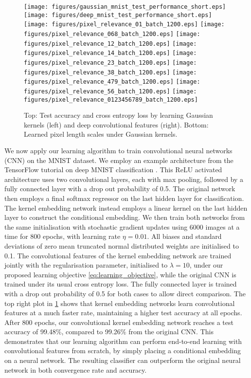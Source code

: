\documentclass{article}
\begin{document}
		\begin{figure}[t]
			\centering 
			\texttt{[image: figures/gaussian\_mnist\_test\_performance\_short.eps]}
			\texttt{[image: figures/deep\_mnist\_test\_performance\_short.eps]}
			\texttt{[image: figures/pixel\_relevance\_01\_batch\_1200.eps]}
			\texttt{[image: figures/pixel\_relevance\_068\_batch\_1200.eps]}
			\texttt{[image: figures/pixel\_relevance\_12\_batch\_1200.eps]}
			\texttt{[image: figures/pixel\_relevance\_14\_batch\_1200.eps]}
			\texttt{[image: figures/pixel\_relevance\_23\_batch\_1200.eps]}
			\texttt{[image: figures/pixel\_relevance\_38\_batch\_1200.eps]}
			\texttt{[image: figures/pixel\_relevance\_479\_batch\_1200.eps]}
			\texttt{[image: figures/pixel\_relevance\_56\_batch\_1200.eps]}
			\texttt{[image: figures/pixel\_relevance\_0123456789\_batch\_1200.eps]}
			\caption{Top: Test accuracy and cross entropy loss by learning Gaussian kernels (left) and deep convolutional features (right). Bottom: Learned pixel length scales under Gaussian kernels.}
			\label{fig:mnist_experiments}
		\end{figure}
		
		We now apply our learning algorithm to train convolutional neural networks (CNN) on the MNIST dataset. We employ an example architecture from the TensorFlow tutorial on deep MNIST classification \citep{abadi2016tensorflow}. This ReLU activated architecture uses two convolutional layers, each with max pooling, followed by a fully connected layer with a drop out probability of 0.5. The original network then employs a final softmax regressor on the last hidden layer for classification. The kernel embedding network instead employs a linear kernel on the last hidden layer to construct the conditional embedding. We then train both networks from the same initialisation with stochastic gradient updates using 6000 images at a time for 800 epochs, with learning rate $\eta = 0.01$. All biases and standard deviations of zero mean truncated normal distributed weights are initialised to 0.1. The convolutional features of the kernel embedding network are trained jointly with the regularisation parameter, initialised to $\lambda = 10$, under our proposed learning objective \eqref{eq:learning_objective}, while the original CNN is trained under its usual cross entropy loss. The fully connected layer is trained with a drop out probability of 0.5 for both cases to allow direct comparison. The top right plot in \cref{fig:mnist_experiments} shows that kernel embedding networks learn convolutional features at a much faster rate, maintaining a higher test accuracy at all epochs. After 800 epochs, our convolutional kernel embedding network reaches a test accuracy of 99.48\%, compared to 99.26\% from the original CNN. This demonstrates that our learning algorithm can perform end-to-end learning with convolutional features from scratch, by simply placing a conditional embedding on a neural network. The resulting classifier can outperform the original neural network in both convergence rate and accuracy.
	
\end{document}
